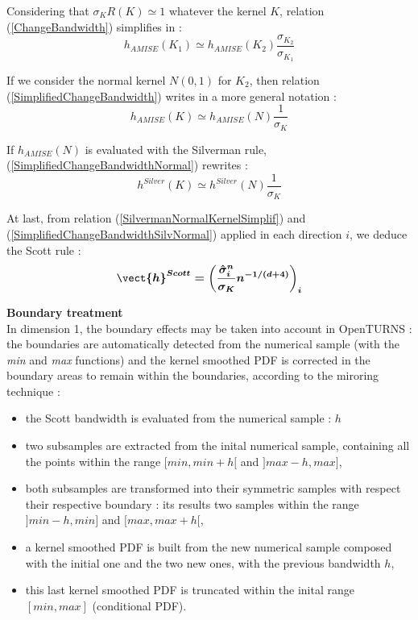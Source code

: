 {  Considering that $\sigma_{K}R(K) \simeq 1$ whatever the kernel $K$,   relation (\ref{ChangeBandwidth}) simplifies in :
  \begin{equation}
    \label{SimplifiedChangeBandwidth}
    h_{AMISE}(K_1) \simeq h_{AMISE}(K_2)\frac{\sigma_{K_2}}{\sigma_{K_1}}
  \end{equation}





  If we consider the normal kernel $N(0,1)$ for $K_2$, then relation (\ref{SimplifiedChangeBandwidth}) writes in a more general notation :
  \begin{equation}
    \label{SimplifiedChangeBandwidthNormal}
    h_{AMISE}(K) \simeq h_{AMISE}(N)\frac{1}{\sigma_{K}}
  \end{equation}

  If $h_{AMISE}(N)$ is evaluated with the Silverman rule, (\ref{SimplifiedChangeBandwidthNormal}) rewrites :
  \begin{equation}
    \label{SimplifiedChangeBandwidthSilvNormal}
    h^{Silver}(K) \simeq h^{Silver}(N)\frac{1}{\sigma_{K}}
  \end{equation}



  At last, from relation (\ref{SilvermanNormalKernelSimplif}) and (\ref{SimplifiedChangeBandwidthSilvNormal}) applied in each direction $i$, we deduce the Scott rule :
  \begin{equation}
    \label{ScottRule}
    \boldsymbol{\vect{h}^{Scott} = \left(\frac{\hat{\sigma}_i^n}{\sigma_K}n^{-1/(d+4)}\right)_i}
  \end{equation}




  \vspace*{0.5cm}

  \textbf{Boundary treatment}\\


  In dimension 1, the boundary effects may be taken into account in OpenTURNS : the boundaries are automatically detected from the numerical sample (with the \textit{min} and \textit{max} functions) and the kernel smoothed PDF is corrected in the boundary areas to remain within the boundaries, according to the miroring technique :
  \begin{itemize}
  \item the Scott bandwidth is evaluated from the numerical sample : $h$
  \item two subsamples are extracted from the inital numerical sample, containing all the points within the range $[min, min + h[$ and  $]max-h, max]$,
  \item both subsamples are transformed into their symmetric samples with respect their respective boundary : its results two samples within the range  $]min-h, min]$ and  $[max, max+h[$,
    \item a kernel smoothed PDF is built from the new numerical sample composed with the initial one and the two new ones, with the previous bandwidth $h$,
    \item this last kernel smoothed PDF is truncated within the inital range  $[min, max]$ (conditional PDF).
  \end{itemize}



}
